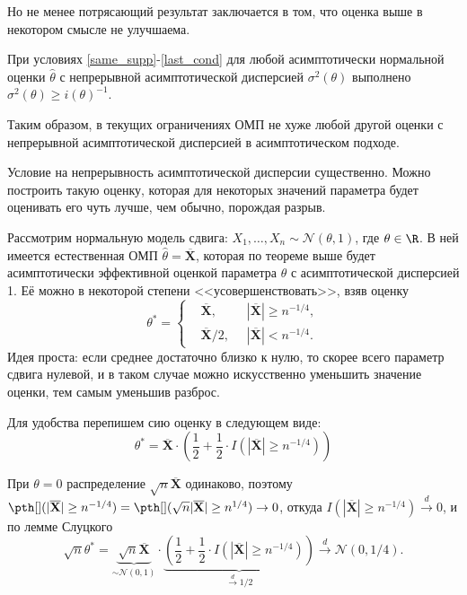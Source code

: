 Но не менее потрясающий результат заключается в том, что оценка выше в некотором смысле не улучшаема.

\begin{theorem}{}{}
    При условиях \ref{same_supp}-\ref{last_cond} для любой асимптотически нормальной оценки $\widehat{\theta}$ с непрерывной асимптотической дисперсией $\sigma^2(\theta)$ выполнено $\sigma^2(\theta) \ge i(\theta)^{-1}$.
\end{theorem}

Таким образом, в текущих ограничениях ОМП не хуже любой другой оценки с непрерывной асимптотической дисперсией в асимптотическом подходе.

\begin{example}
    Условие на непрерывность асимптотической дисперсии существенно. Можно построить такую оценку, которая для некоторых значений параметра будет оценивать его чуть лучше, чем обычно, порождая разрыв.

    Рассмотрим нормальную модель сдвига: $X_1, \ldots, X_n \sim \mathcal{N}(\theta, 1)$, где $\theta \in \R$. В ней имеется естественная ОМП $\widehat{\theta} = \overline{\mathbf X}$, которая по теореме выше будет асимптотически эффективной оценкой параметра $\theta$ с асимптотической дисперсией 1. Её можно в некоторой степени <<усовершенствовать>>, взяв оценку
    \[
    \theta^* = \left\{
    \begin{aligned}
        &\overline{\mathbf X},\;\;&|\overline{\mathbf X}| \ge n^{-1/4},\\
        &\overline{\mathbf X}/2,\;\;&|\overline{\mathbf X}| < n^{-1/4}.
    \end{aligned}
    \right.
    \]
    Идея проста: если среднее достаточно близко к нулю, то скорее всего параметр сдвига нулевой, и в таком случае можно искусственно уменьшить значение оценки, тем самым уменьшив разброс.

    Для удобства перепишем сию оценку в следующем виде:
    \[
    \theta^* = \overline{\mathbf X} \cdot \left(\frac{1}{2} + \frac{1}{2}\cdot I(|\overline{\mathbf X}| \ge n^{-1/4})\right)
    \]

    При $\theta = 0$ распределение $\sqrt{n}\overline{\mathbf X}$ одинаково, поэтому $\pth[](|\overline{\mathbf X}| \ge n^{-1/4}) = \pth[](\sqrt{n}|\overline{\mathbf X}| \ge n^{1/4}) \to 0$, откуда $I(|\overline{\mathbf X}| \ge n^{-1/4}) \stackrel{d}{\to} 0$, и по лемме Слуцкого
    $$\sqrt{n}\theta^* = \underbrace{\sqrt{n}\overline{\mathbf X}}_{\sim \mathcal{N}(0, 1)} \cdot \underbrace{\left(\frac{1}{2} + \frac{1}{2}\cdot I(|\overline{\mathbf X}| \ge n^{-1/4})\right)}_{\stackrel{d}{\to} 1/2} \stackrel{d}{\to} \mathcal{N}(0, 1/4).$$


\end{example}

